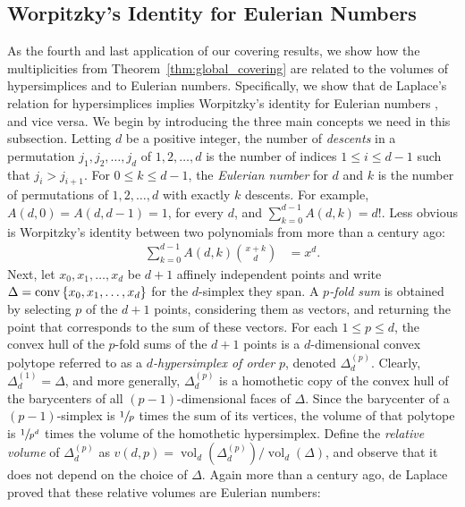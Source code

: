 \documentclass[10pt,a4paper]{article}
\newcommand {\mm}[1] {\ifmmode{#1}\else{\mbox{\(#1\)}}\fi}
\theoremstyle{plain}
\newcommand{\conv}[1]       {\mm{{\rm conv\,}{#1}}}
\DeclareMathOperator{\vol}{vol}
\begin{document}
\subsection{Worpitzky's Identity for Eulerian Numbers}
\label{sec:4.4}
As the fourth and last application of our covering results, we show how the multiplicities from Theorem~\ref{thm:global_covering} are related to the volumes of hypersimplices and to Eulerian numbers.
Specifically, we show that de Laplace's relation for hypersimplices \cite{Lap86} implies Worpitzky's identity for Eulerian numbers \cite{Wor83}, and vice versa.
\smallskip
We begin by introducing the three main concepts we need in this subsection.
Letting $d$ be a positive integer, the number of \emph{descents} in a permutation $j_1, j_2, \ldots, j_d$ of $1, 2, \ldots, d$ is the number of indices $1 \leq i \leq d-1$ such that $j_i > j_{i+1}$.
For $0 \leq k \leq d-1$, the \emph{Eulerian number} for $d$ and $k$ is the number of permutations of $1,2,\ldots,d$ with exactly $k$ descents.
For example, $A(d,0) = A(d,d-1) = 1$, for every $d$, and $\sum_{k=0}^{d-1} A(d,k) = d!$.
Less obvious is Worpitzky's identity \cite{Wor83} between two polynomials from more than a century ago:
\begin{align}
  \sum\nolimits_{k=0}^{d-1} A(d,k) \binom{x+k}{d} &= x^d .
  \label{eqn:Worpitzky_identity}
\end{align}
Next, let $x_0, x_1, \ldots, x_d$ be $d+1$ affinely independent points and write $\Delta = \conv{\{x_0, x_1, \ldots, x_d\}}$ for the $d$-simplex they span.
A \emph{$p$-fold sum} is obtained by selecting $p$ of the $d+1$ points, considering them as vectors, and returning the point that corresponds to the sum of these vectors.
For each $1 \leq p \leq d$, the convex hull of the $p$-fold sums of the $d+1$ points is a $d$-dimensional convex polytope referred to as a \emph{$d$-hypersimplex of order} $p$, denoted $\Delta_d^{(p)}$.
Clearly, $\Delta_d^{(1)} = \Delta$, and more generally, $\Delta_d^{(p)}$ is a homothetic copy of the convex hull of the barycenters of all $(p-1)$-dimensional faces of $\Delta$.
Since the barycenter of a $(p-1)$-simplex is $\sfrac{1}{p}$ times the sum of its vertices, the volume of that polytope is $\sfrac{1}{p^d}$ times the volume of the homothetic hypersimplex.
Define the \emph{relative volume} of $\Delta_d^{(p)}$ as $v(d,p) = {\vol_d(\Delta^{(p)}_d)} / {\vol_d(\Delta)}$, and observe that it does not depend on the choice of $\Delta$.
Again more than a century ago, de Laplace~\cite{Lap86} proved that these relative volumes are Eulerian numbers:
\end{document}
